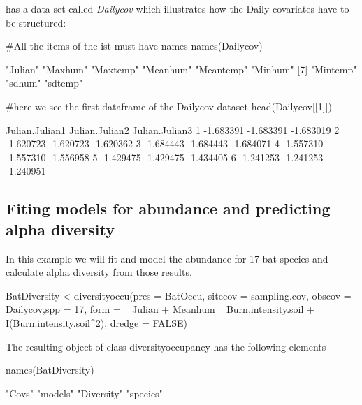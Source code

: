 \documentclass[article]{jss}
\begin{document}
 has a data set called \emph{Dailycov} which
illustrates how the Daily covariates have to be structured:

\begin{CodeChunk}
\begin{CodeInput}
#All the items of the ist must have names
names(Dailycov)
\end{CodeInput}
\begin{CodeOutput}
[1] "Julian"   "Maxhum"   "Maxtemp"  "Meanhum"  "Meantemp" "Minhum"  
[7] "Mintemp"  "sdhum"    "sdtemp"  
\end{CodeOutput}
\begin{CodeInput}
#here we see the first dataframe of the Dailycov dataset
head(Dailycov[[1]])
\end{CodeInput}
\begin{CodeOutput}
  Julian.Julian1 Julian.Julian2 Julian.Julian3
1      -1.683391      -1.683391      -1.683019
2      -1.620723      -1.620723      -1.620362
3      -1.684443      -1.684443      -1.684071
4      -1.557310      -1.557310      -1.556958
5      -1.429475      -1.429475      -1.434405
6      -1.241253      -1.241253      -1.240951
\end{CodeOutput}
\end{CodeChunk}

\subsection{Fiting models for abundance and predicting alpha
diversity}\label{fiting-models-for-abundance-and-predicting-alpha-diversity}

In this example we will fit and model the abundance for 17 bat species
and calculate alpha diversity from those results.

\begin{CodeChunk}
\begin{CodeInput}
BatDiversity <-diversityoccu(pres = BatOccu, sitecov = sampling.cov, obscov =
Dailycov,spp = 17, form = ~ Julian + Meanhum ~ Burn.intensity.soil +
I(Burn.intensity.soil^2), dredge = FALSE)
\end{CodeInput}
\end{CodeChunk}

The resulting object of class diversityoccupancy has the following
elements

\begin{CodeChunk}
\begin{CodeInput}
names(BatDiversity)
\end{CodeInput}
\begin{CodeOutput}
[1] "Covs"      "models"    "Diversity" "species"  
\end{CodeOutput}
\end{CodeChunk}
\end{document}
